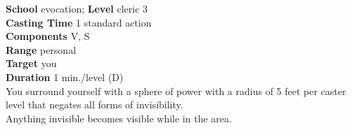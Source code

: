 \textbf{School} evocation; \textbf{Level} cleric 3\\
\textbf{Casting Time} 1 standard action\\
\textbf{Components} V, S\\
\textbf{Range} personal\\
\textbf{Target} you\\
\textbf{Duration} 1 min./level (D)\\
You surround yourself with a sphere of power with a radius of 5 feet per caster level that negates all forms of invisibility.\\
Anything invisible becomes visible while in the area.\\
